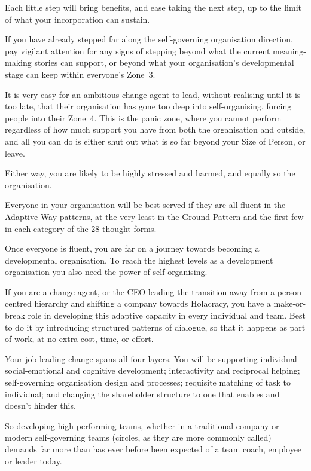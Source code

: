 Each little step will bring benefits, and ease taking the next step, up to the limit of what your incorporation can sustain.


If you have already stepped far along the self-governing organisation direction, pay vigilant attention for any signs of stepping beyond what the current meaning\hyp{}making stories can support, or beyond what your organisation's developmental stage can keep within everyone's Zone~3. 


It is very easy for an ambitious change agent to lead, without realising until it is too late, that their organisation has gone too deep into self-organising, forcing people into their Zone~4. This is the panic zone, where you cannot perform regardless of how much support you have from both the organisation and outside, and all you can do is either shut out what is so far beyond your Size of Person,  or leave. 


Either way, you are likely to be highly stressed and harmed, and equally so the organisation. 


Everyone in your organisation will be best served if they are all fluent in the Adaptive Way patterns, at the very least in the Ground Pattern and the first few in each category of the 28 thought forms.  


Once everyone is fluent, you are far on a journey towards becoming a developmental organisation. To reach the highest levels as a development organisation you also need the power of self-organising.  


If you are a change agent, or the CEO leading the transition away from a person-centred hierarchy and shifting a company towards Holacracy, you have a make-or-break role in developing this adaptive capacity in every individual and team. Best to do it by introducing structured patterns of dialogue, so that it happens as part of work, at no extra cost, time, or effort.


Your job leading change spans all four layers. You will be supporting individual social-emotional and cognitive development; interactivity and reciprocal helping; self-governing organisation design and processes; requisite matching of task to individual; and changing the shareholder structure to one that enables and doesn’t hinder this. 


So developing high performing teams, whether in a traditional company or modern self-governing teams (circles, as they are more commonly called) demands far more than has ever before been expected of a team coach, employee or leader today. 


